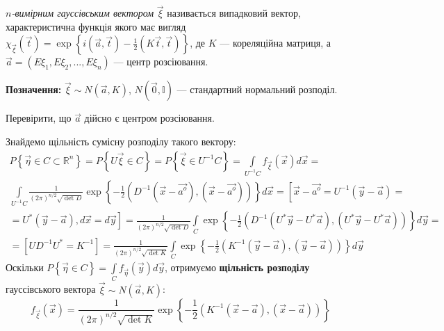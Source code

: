 \begin{definition}
    $n$\emph{-вимірним гауссівським вектором} $\vec{\xi}$ називається випадковий вектор,
    характеристична функція якого має вигляд $\chi_{\vec{\xi}}(\vec{t}) = \exp\left\{i(\vec{a}, \vec{t}) - \frac{1}{2}(K\vec{t}, \vec{t})\right\}$,
    де $K$ --- кореляційна матриця, а $\vec{a} = \left( E\xi_1, E\xi_2, ..., E\xi_n\right)$ --- центр розсіювання.
\end{definition}
\noindent \textbf{Позначення:} $\vec{\xi} \sim {N}( \vec{a}, K)$, ${N}( \vec{0}, \mathbb{I})$ --- стандартний нормальний розподіл.
\begin{exercise}
    Перевірити, що $\vec{a}$ дійсно є центром розсіювання.
\end{exercise}
Знайдемо щільність сумісну розподілу такого вектору:
\begin{gather*}
    P\left\{\vec{\eta} \in C \subset \mathbb{R}^n\right\} = P\left\{U\vec{\xi}\in C\right\} = 
    P\left\{\vec{\xi}\in U^{-1}C\right\} = 
    \int\limits_{U^{-1}C} f_{\vec{\xi}}(\vec{x}) d\vec{x} = \\
    \int\limits_{U^{-1}C} \frac{1}{(2\pi)^{n/2} \sqrt{{\det{D}}}} \exp \left\{ -\frac{1}{2} \left( D^{-1}(\vec{x} - \vec{a^o}), (\vec{x} - \vec{a^o})\right)\right\} d\vec{x} =
    \left[ \vec{x} - \vec{a^o} = U^{-1}(\vec{y} - \vec{a}) = \right. \\ \left. = U^{*}(\vec{y} - \vec{a}), d\vec{x} = d\vec{y}\right] = 
    \frac{1}{(2\pi)^{n/2} \sqrt{{\det{D}}}} \int\limits_{C} \exp \left\{ -\frac{1}{2} \left( D^{-1}(U^{*}\vec{y} - U^{*}\vec{a}), (U^{*}\vec{y} - U^{*}\vec{a})\right)\right\} d\vec{y} = \\
    = \left[ UD^{-1}U^{*} = K^{-1}\right] =
    \frac{1}{(2\pi)^{n/2} \sqrt{{\det{K}}}} \int\limits_{C} \exp \left\{ -\frac{1}{2} \left( K^{-1}(\vec{y} - \vec{a}), (\vec{y} - \vec{a})\right)\right\} d\vec{y}
\end{gather*}
Оскільки $P\left\{\vec{\eta} \in C\right\} = \int\limits_{C} f_{\vec{\eta}}(\vec{y}) d\vec{y}$,
отримуємо \textbf{щільність розподілу} гауссівського вектора $\vec{\xi} \sim {N}(\vec{a}, K)$:
\begin{equation}
    f_{\vec{\xi}}(\vec{x}) = \frac{1}{(2\pi)^{n/2} \sqrt{{\det{K}}}} \exp \left\{ -\frac{1}{2} \left( K^{-1}(\vec{x} - \vec{a}), (\vec{x} - \vec{a})\right)\right\}
\end{equation}

